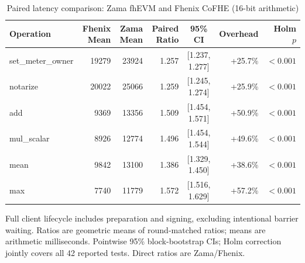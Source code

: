 \begin{table}[!t]
\caption{Paired latency comparison: Zama fhEVM and Fhenix CoFHE (16-bit arithmetic)}
\label{tab:zama-fhenix-lifecycle-comparison}
\centering
\footnotesize
\setlength{\tabcolsep}{5pt}
\begin{tabular}{|l|r|r|r|c|r|r|}
\hline
\textbf{Operation} & \textbf{Fhenix Mean} & \textbf{Zama Mean} & \textbf{Paired Ratio} & \textbf{95\% CI} & \textbf{Overhead} & \textbf{Holm \(p\)} \\
\hline
set\_meter\_owner & 19279 & 23924 & 1.257 & [1.237, 1.277] & +25.7\% & $<0.001$ \\
notarize & 20022 & 25066 & 1.259 & [1.245, 1.274] & +25.9\% & $<0.001$ \\
add & 9369 & 13356 & 1.509 & [1.454, 1.571] & +50.9\% & $<0.001$ \\
mul\_scalar & 8926 & 12774 & 1.496 & [1.454, 1.544] & +49.6\% & $<0.001$ \\
mean & 9842 & 13100 & 1.386 & [1.329, 1.450] & +38.6\% & $<0.001$ \\
max & 7740 & 11779 & 1.572 & [1.516, 1.629] & +57.2\% & $<0.001$ \\
\hline
\end{tabular}
\vspace{2pt}
\parbox{\textwidth}{\scriptsize Full client lifecycle includes preparation and signing, excluding intentional barrier waiting. Ratios are geometric means of round-matched ratios; means are arithmetic milliseconds. Pointwise 95\% block-bootstrap CIs; Holm correction jointly covers all 42 reported tests. Direct ratios are Zama/Fhenix.}
\end{table}

